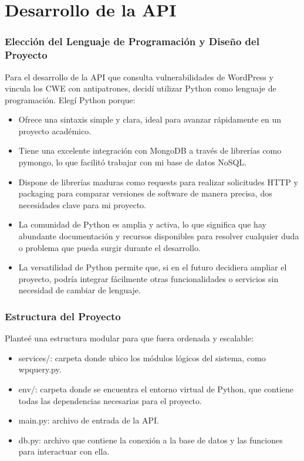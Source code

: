 \section{Desarrollo de la API}

\subsubsection{Elección del Lenguaje de Programación y Diseño del Proyecto}

Para el desarrollo de la API que consulta vulnerabilidades de WordPress y vincula los CWE con antipatrones, decidí utilizar Python como lenguaje de programación.
Elegí Python porque:
\begin{itemize}
    \item Ofrece una sintaxis simple y clara, ideal para avanzar rápidamente en un proyecto académico.
    \item Tiene una excelente integración con MongoDB a través de librerías como pymongo, lo que facilitó trabajar con mi base de datos NoSQL.
    \item Dispone de librerías maduras como requests para realizar solicitudes HTTP y packaging para comparar versiones de software de manera precisa, dos necesidades clave para mi proyecto.
    \item La comunidad de Python es amplia y activa, lo que significa que hay abundante documentación y recursos disponibles para resolver cualquier duda o problema que pueda surgir durante el desarrollo.
    \item La versatilidad de Python permite que, si en el futuro decidiera ampliar el proyecto, podría integrar fácilmente otras funcionalidades o servicios sin necesidad de cambiar de lenguaje.
\end{itemize}

\subsubsection{Estructura del Proyecto}

Planteé una estructura modular para que fuera ordenada y escalable:
\begin{itemize}
    \item services/: carpeta donde ubico los módulos lógicos del sistema, como wpquery.py.
    \item env/: carpeta donde se encuentra el entorno virtual de Python, que contiene todas las dependencias necesarias para el proyecto.
    \item main.py: archivo de entrada de la API.
    \item db.py: archivo que contiene la conexión a la base de datos y las funciones para interactuar con ella.
\end{itemize}

